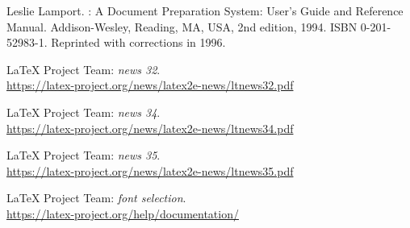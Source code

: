 \documentclass{ltnews}
\providecommand\Dash {\unskip \textemdash}
\begin{document}

\begin{thebibliography}{9}

\fontsize{9.3}{11.3}\selectfont



Leslie Lamport.
\newblock {\LaTeX}: {A} Document Preparation System: User's Guide and Reference
  Manual.
\newblock \mbox{Addison}-Wesley, Reading, MA, USA, 2nd edition, 1994.
\newblock ISBN 0-201-52983-1.
\newblock Reprinted with corrections in 1996.

 \LaTeX{} Project Team:
  \emph{\LaTeXe{} news 32}.\\
  \url{https://latex-project.org/news/latex2e-news/ltnews32.pdf}

 \LaTeX{} Project Team:
  \emph{\LaTeXe{} news 34}.\\
  \url{https://latex-project.org/news/latex2e-news/ltnews34.pdf}

 \LaTeX{} Project Team:
  \emph{\LaTeXe{} news 35}.\\
  \url{https://latex-project.org/news/latex2e-news/ltnews35.pdf}

 \LaTeX{} Project Team:
  \emph{\LaTeXe{} font selection}.\\
  \url{https://latex-project.org/help/documentation/}

\end{thebibliography}
\end{document}
